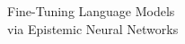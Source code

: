 \documentclass[preview]{standalone}
\begin{document}
\begin{center}
Fine-Tuning Language Models \\ via Epistemic Neural Networks
\end{center}
\end{document}
